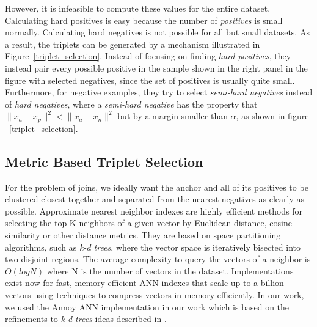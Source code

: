 However, it is infeasible to compute these values for the entire dataset.  Calculating hard positives is easy because the number of \textit{positives} is small normally.  Calculating hard negatives is not possible for all but small datasets.  As a result, the triplets can be generated by a mechanism illustrated in Figure~\ref{triplet_selection}.  Instead of focusing on finding \textit{hard positives}, they instead pair every possible positive in the sample shown in the right panel in the figure with selected negatives, since the set of positives is usually quite small.  Furthermore, for negative examples, they try to select \textit{semi-hard negatives} instead of \textit{hard negatives}, where a \textit{semi-hard negative} has the property that $\|x_a - x_p \|^2 < \|x_a - x_n \|^2$ but by a margin smaller than $\alpha$, as shown in figure ~\ref{triplet_selection}.  


\subsection{Metric Based Triplet Selection}
For the problem of joins, we ideally want the anchor and all of its positives to be clustered closest together and separated from the nearest negatives as clearly as possible.  Approximate nearest neighbor indexes are highly efficient methods for selecting the top-K neighbors of a given vector by Euclidean distance, cosine similarity or other distance metrics.  They are based on space partitioning algorithms, such as \textit{k-d trees}, where the vector space is iteratively bisected into two disjoint regions.  The average complexity to query the vectors of a neighbor is $O(log N)$ where N is the number of vectors in the dataset.  Implementations exist now for fast, memory-efficient ANN indexes that scale up to a billion vectors \cite{JDH17} using techniques to compress vectors in memory efficiently.  In our work, we used the Annoy ANN implementation \cite{annoy_git} in our work which is based on the refinements to \textit{k-d trees} ideas described in \cite{ann_paper}.

